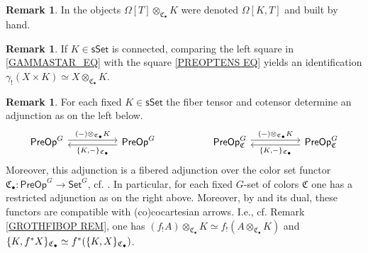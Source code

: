 \documentclass[a4paper,10pt
,draft
]{article}%
\numberwithin{equation}{section}
\numberwithin{figure}{section}
\theoremstyle{definition} %
\newtheorem{remark}[equation]{Remark}%
\newcommand{\1}{\ensuremath{\mathbbm 1}}%
\begin{document}
\begin{remark}\label{BYHAND1 REM}
	In \cite[\S 7.1]{CM13b}
	the objects
	$\Omega[T] \otimes_{\mathfrak{C}_{\bullet}} K$ were denoted 
	$\Omega[K,T]$
	and built by hand.
\end{remark}


\begin{remark}\label{OTIMCON REM}
	If $K \in \mathsf{sSet}$ is connected,
	comparing the left square in \eqref{GAMMASTAR_EQ}
	with the square \eqref{PREOPTENS EQ} yields an identification
	$\gamma_! \left(X \times K\right) \simeq 
	X \otimes_{\mathfrak{C}_{\bullet}} K$.
\end{remark}


\begin{remark}\label{TENSCOADJ REM}
	For each fixed $K \in \mathsf{sSet}$
	the fiber tensor and cotensor 
	determine an adjunction as on the left below.
\[
\begin{tikzcd}[column sep =50]
	\mathsf{PreOp}^G \ar[shift left=1]{r}
	{(-) \otimes_{\mathfrak{C}_{\bullet}} K}
&
	\mathsf{PreOp}^G \ar[shift left=1]{l}
	{\{K,-\}_{\mathfrak{C}_{\bullet}}}
&
	\mathsf{PreOp}^G_{\mathfrak{C}} \ar[shift left=1]{r}
	{(-) \otimes_{\mathfrak{C}_{\bullet}} K}
&
	\mathsf{PreOp}^G_{\mathfrak{C}} \ar[shift left=1]{l}
	{\{K,-\}_{\mathfrak{C}_{\bullet}}}
\end{tikzcd}
\]
Moreover, this adjunction is a fibered adjunction over the color set functor
$\mathfrak{C}_{\bullet} \colon
\mathsf{PreOp}^G \to \mathsf{Set}^G$,
cf. \cite[Def. \ref{OC-FIBADJ DEF}]{BP_FCOP}.
In particular, for each fixed $G$-set of colors
$\mathfrak{C}$
one has a restricted adjunction as on the right above.
Moreover, by 
\cite[Prop. \ref{OC-FIBADJCAR PROP}]{BP_FCOP} and its dual,
these functors are compatible with (co)cocartesian arrows.
I.e., cf. Remark \ref{GROTHFIBOP REM},
one has
$(f_!A) \otimes_{\mathfrak{C}_{\bullet}} K
\simeq
f_!(A \otimes_{\mathfrak{C}_{\bullet}} K)$
and 
$\{K,f^{\**}X\}_{\mathfrak{C}_{\bullet}}
\simeq
f^{\**}(\{K,X\}_{\mathfrak{C}_{\bullet}})$.
\end{remark}
\end{document}
